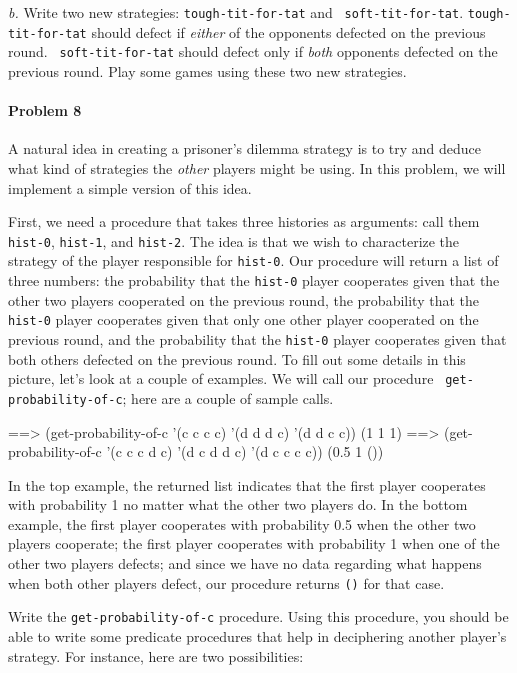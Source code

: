 {\it b.} Write two new strategies: {\tt tough-tit-for-tat} and {\tt
soft-tit-for-tat}. {\tt tough-tit-for-tat} should defect if {\it
either} of the opponents defected on the previous round.  {\tt
soft-tit-for-tat} should defect only if {\it both} opponents defected
on the previous round. Play some games using these two new strategies.

\paragraph{Problem 8}
A natural idea in creating a prisoner's dilemma strategy is to
try and deduce what kind of strategies the {\it other} players might
be using. In this problem, we will implement a simple version of
this idea.

First, we need a procedure that takes three histories as arguments:
call them {\tt hist-0}, {\tt hist-1}, and {\tt hist-2}. The idea is
that we wish to characterize the strategy of the player responsible
for {\tt hist-0}. Our procedure will return a list of three numbers:
the probability that the {\tt hist-0} player cooperates given that the
other two players cooperated on the previous round, the probability
that the {\tt hist-0} player cooperates given that only one other
player cooperated on the previous round, and the probability that the
{\tt hist-0} player cooperates given that both others defected on the
previous round. To fill out some details in this picture, let's look
at a couple of examples. We will call our procedure {\tt
get-probability-of-c}; here are a couple of sample calls.

\beginlisp
==> (get-probability-of-c '(c c c c) '(d d d c) '(d d c c))
(1 1 1)
\null
==> (get-probability-of-c '(c c c d c) '(d c d d c) '(d c c c c))
(0.5 1 ())
\endlisp

In the top example, the returned list indicates that the first player
cooperates with probability 1 no matter what the other two players do.
In the bottom example, the first player cooperates with probability
0.5 when the other two players cooperate; the first player cooperates
with probability 1 when one of the other two players defects; and
since we have no data regarding what happens when both other players
defect, our procedure returns {\tt ()} for that case.

Write the {\tt get-probability-of-c} procedure. Using this procedure,
you should be able to write some predicate procedures that help
in deciphering another player's strategy. For instance, here are
two possibilities:

